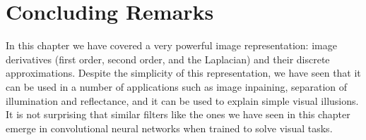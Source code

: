
\section{Concluding Remarks}

In this chapter we have covered a very powerful image representation: image derivatives (first order, second order, and the Laplacian) and their discrete approximations. Despite the simplicity of this representation, we have seen that it can be used in a number of applications such as image inpaining, separation of illumination and reflectance, and it can be used to explain simple visual illusions. It is not surprising that similar filters like the ones we have seen in this chapter emerge in convolutional neural networks when trained to solve visual tasks. 


